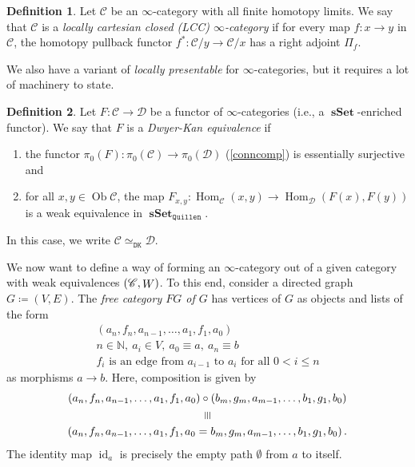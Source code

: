 \documentclass[10pt,letterpaper,cm]{nupset}
\theoremstyle{definition}
\newtheorem{definition}{Definition}[subsection]
\theoremstyle{theorem}
\theoremstyle{remark}
\newcommand{\vequiv}{\rotatebox[origin=c]{-90}{$\equiv$}}
\DeclareMathOperator{\ob}{Ob}
\newcommand{\0}{\mathbf{0}}
\newcommand{\1}{\mathbf{1}}
\newcommand{\2}{\mathbf{2}}
\DeclareMathOperator{\sset}{\mathbf{sSet}}
\renewcommand{\c}{\mathscr{C}}
\renewcommand{\d}{\mathscr{D}}
\newcommand{\N}{\mathbb N}
\DeclareMathOperator{\Hom}{Hom}
\DeclareMathOperator{\idd}{id}
\DeclareMathOperator{\we}{\mathnormal{W}}
\newcommand{\be}{\begin{enumerate}}
\newcommand{\ee}{\end{enumerate}}
\begin{document}
\smallskip

\begin{definition}
Let $\c$ be an $\infty$-category with all finite homotopy limits. We say that $\c$ is a \textit{locally cartesian closed (LCC) $\infty$-category} if for every map $f: x \to y$ in $\c$, the homotopy pullback functor $f^{\ast}: \c/y \to \c/x$ has a right adjoint $\Pi_f$.
\end{definition}

\medskip

We also have a variant of \textit{locally presentable} for $\infty$-categories, but it requires a lot of machinery to state.


\begin{definition}
Let $F : \c \to \d$ be a functor of $\infty$-categories (i.e., a $\sset$-enriched functor). We say that $F$ is a \textit{Dwyer-Kan equivalence} if 
\be[label=(\roman*)]
\item the functor $\pi_0(F) : \pi_0(\c) \to \pi_0(\d)$ (\cref{conncomp}) is essentially surjective and
\item for all $x,y\in \ob{\c}$, the map $F_{x,y} : \Hom_{\c}(x,y) \to \Hom_{\d}(F(x), F(y))$ is a weak equivalence in $\sset_{\mathtt{Quillen}}$.
\ee
In this case, we write $\c \simeq_{\mathtt{DK}} \d$.
\end{definition}

\medskip

We now want to define a way of forming an $\infty$-category out of a given category with weak equivalences $\left(\c, \we\right)$. To this end, consider a  directed graph $G\coloneqq \left(V, E\right)$. The \textit{free category $F{G}$ of $G$} has vertices of $G$ as objects and lists of the form
\begin{gather*}
\left(a_n,f_n,a_{n-1},\ldots,a_{1},f_1,a_0\right)
\\  n\in \N, \ a_i \in V, \ a_0 \equiv a, \ a_n \equiv b
\\ f_i \text{ is an edge from $a_{i-1}$ to $a_i$ for all $0< i \leq n$} 
\end{gather*}
as morphisms $a\to b$. Here, composition is given by
\begin{gather*}
 \left(a_n,f_n,a_{n-1},\ldots,a_{1},f_1,a_0\right)\circ \left(b_m,g_m,a_{m-1},\ldots,b_{1},g_1,b_0\right) 
\\ \vequiv
\\ \left(a_n,f_n,a_{n-1},\ldots,a_{1},f_1,a_0= b_m,g_m,a_{m-1},\ldots,b_{1},g_1,b_0\right). 
\end{gather*}
The identity map $\idd_a$ is precisely the empty path $\emptyset$ from $a$ to itself.
\end{document}
